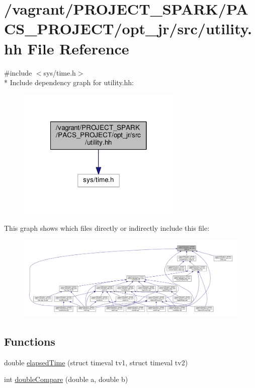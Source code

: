 \hypertarget{utility_8hh}{\section{/vagrant/\-P\-R\-O\-J\-E\-C\-T\-\_\-\-S\-P\-A\-R\-K/\-P\-A\-C\-S\-\_\-\-P\-R\-O\-J\-E\-C\-T/opt\-\_\-jr/src/utility.hh File Reference}
\label{utility_8hh}
}
{\ttfamily \#include $<$sys/time.\-h$>$}\\*
Include dependency graph for utility.\-hh\-:
\nopagebreak
\begin{figure}[H]
\begin{center}
\leavevmode
\includegraphics[width=222pt]{utility_8hh__incl}
\end{center}
\end{figure}
This graph shows which files directly or indirectly include this file\-:
\nopagebreak
\begin{figure}[H]
\begin{center}
\leavevmode
\includegraphics[width=350pt]{utility_8hh__dep__incl}
\end{center}
\end{figure}
\subsection*{Functions}
\begin{DoxyCompactItemize}
\item 
double \hyperlink{utility_8hh_affb98702b6d646743be567444260ac1f}{elapsed\-Time} (struct timeval tv1, struct timeval tv2)
\item 
int \hyperlink{utility_8hh_a9d47b6f031f040e12b256b8aaca54671}{double\-Compare} (double a, double b)
\end{DoxyCompactItemize}
